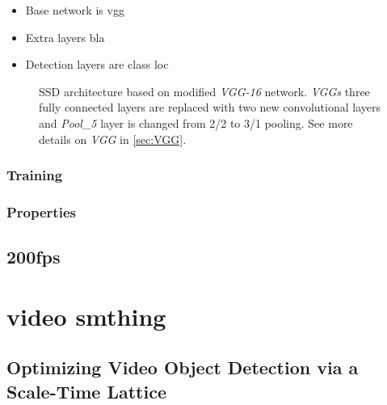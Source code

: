 \begin{itemize}
    \item Base network is vgg
    \item Extra layers bla
    \item Detection layers are class loc
\end{itemize}

\begin{figure}
    \VGGSSD
    \caption{SSD architecture based on modified \textit{VGG-16} network. \textit{VGGs} three fully connected layers are replaced with two new convolutional layers and \textit{Pool\_5} layer is changed from 2/2 to 3/1 pooling. See more details on \textit{VGG} in \cref{sec:VGG}.}
    \label{fig:VGGSSD}
\end{figure}


\subsubsection{Training}

\subsubsection{Properties}


\subsection{200fps}

\section{video smthing}
\subsection{Optimizing Video Object Detection via a Scale-Time Lattice}
